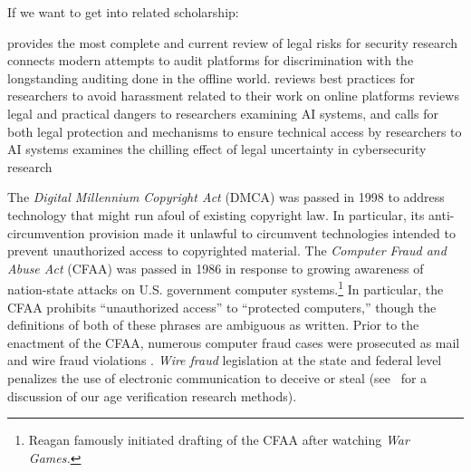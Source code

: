 If we want to get into related scholarship:
\begin{outline}
\1 \cite{parkResearchersGuideLegal} provides the most complete and current review of legal risks for security research 
\1 \cite{bhandari2024} connects modern attempts to audit platforms for discrimination with the longstanding auditing done in the offline world.
\1 
\1 \cite{marwick2016} reviews best practices for researchers to avoid harassment related to their work on online platforms
\1 \cite{longpre_safe_2024} reviews legal and practical dangers to researchers examining AI systems, and calls for both legal protection and mechanisms to ensure technical access by researchers to AI systems
\1 \cite{mulligan_cybersecurity_2015} examines the chilling effect of legal uncertainty in cybersecurity research
\end{outline}


The \textit{Digital Millennium Copyright Act} (DMCA) was passed in 1998 to address technology that might run afoul of existing copyright law. In particular, its anti-circumvention provision made it unlawful to circumvent technologies intended to prevent unauthorized access to copyrighted material. The \textit{Computer Fraud and Abuse Act} (CFAA) was passed in 1986 in response to growing awareness of nation-state attacks on U.S. government computer systems.\footnote{Reagan famously initiated drafting of the CFAA after watching \textit{War Games.}} In particular, the CFAA prohibits ``unauthorized access'' to ``protected computers,'' though the definitions of both of these phrases are ambiguous as written. Prior to the enactment of the CFAA, numerous computer fraud cases were prosecuted as mail and wire fraud violations . \textit{Wire fraud} legislation at the state and federal level penalizes the use of electronic communication to deceive or steal (see~ for a discussion of our age verification research methods). 



